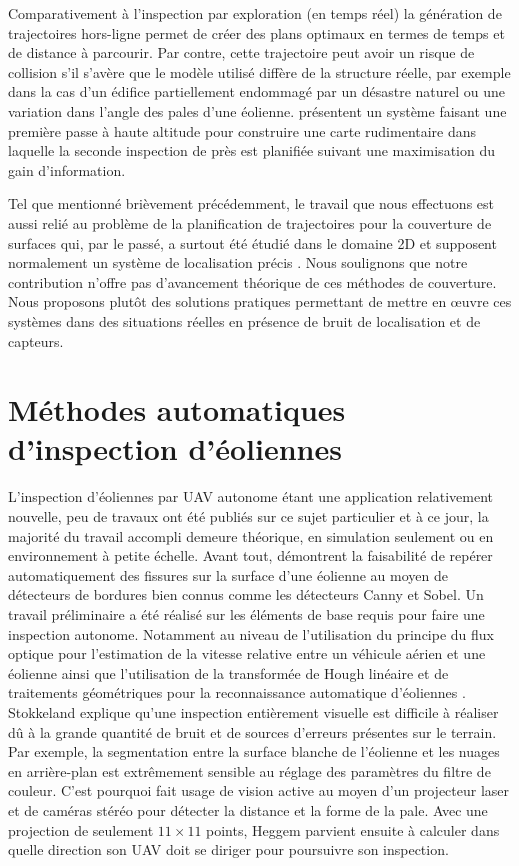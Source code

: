 Comparativement à l'inspection par exploration (en temps réel) la génération de trajectoires hors-ligne permet de créer des plans optimaux en termes de temps et de distance à parcourir. Par contre, cette trajectoire peut avoir un risque de collision s'il s'avère que le modèle utilisé diffère de la structure réelle, par exemple dans la cas d'un édifice partiellement endommagé par un désastre naturel ou une variation dans l'angle des pales d'une éolienne. \citep{Hepp2017} présentent un système faisant une première passe à haute altitude pour construire une carte rudimentaire dans laquelle la seconde inspection de près est planifiée suivant une maximisation du gain d'information.

Tel que mentionné brièvement précédemment, le travail que nous effectuons est aussi relié au problème de la planification de trajectoires pour la couverture de surfaces qui, par le passé, a surtout été étudié dans le domaine 2D et supposent normalement un système de localisation précis \citep{Hert1996, acar2002morse, Acar2002, lim2014crack}. Nous soulignons que notre contribution n'offre pas d'avancement théorique de ces méthodes de couverture. Nous proposons plutôt des solutions pratiques permettant de mettre en \oe uvre ces systèmes dans des situations réelles en présence de bruit de localisation et de capteurs.

\section{Méthodes automatiques d'inspection d'éoliennes}\label{subsec:eolienne}

L'inspection d'éoliennes par UAV autonome étant une application relativement nouvelle, peu de travaux ont été publiés sur ce sujet particulier et à ce jour, la majorité du travail accompli demeure théorique, en simulation seulement ou en environnement à petite échelle. Avant tout, \citep{Zhang2014} démontrent la faisabilité de repérer automatiquement des fissures sur la surface d'une éolienne au moyen de détecteurs de bordures bien connus comme les détecteurs Canny et Sobel. Un travail préliminaire a été réalisé sur les éléments de base requis pour faire une inspection autonome. Notamment au niveau de l'utilisation du principe du flux optique pour l'estimation de la vitesse relative entre un véhicule aérien et une éolienne \citep{Hoglund2014} ainsi que l'utilisation de la transformée de Hough linéaire et de traitements géométriques pour la reconnaissance automatique d'éoliennes \citep{Stokkeland2015}. Stokkeland explique qu'une inspection entièrement visuelle est difficile à réaliser dû à la grande quantité de bruit et de sources d'erreurs présentes sur le terrain. Par exemple, la segmentation entre la surface blanche de l'éolienne et les nuages en arrière-plan est extrêmement sensible au réglage des paramètres du filtre de couleur. C'est pourquoi \citep{Heggem2017} fait usage de vision active au moyen d'un projecteur laser et de caméras stéréo pour détecter la distance et la forme de la pale. Avec une projection de seulement $11 \times 11$ points, Heggem parvient ensuite à calculer dans quelle direction son UAV doit se diriger pour poursuivre son inspection.

